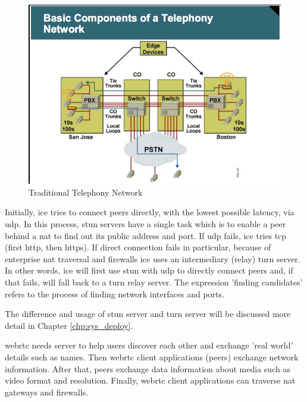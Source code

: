 \begin{figure}
	\centering
    	\includegraphics[height=0.40\textheight,natwidth=610,natheight=642]{figs/telephony_network.png}
  	\caption{Traditional Telephony Network}
  	\label{fig:telephony_network}
\end{figure}

\par Initially, \gls{ice} tries to connect peers directly, with the lowest possible latency, via \gls{udp}. In this process, \gls{stun} servers have a single task which is to enable a peer behind a \gls{nat} to find out its public address and port. If \gls{udp} fails, \gls{ice} tries \gls{tcp} (first \gls{http}, then \gls{https}). If direct connection fails in particular, because of enterprise \gls{nat} traversal and firewalls \gls{ice} uses an intermediary (relay) \gls{turn} server. In other words, \gls{ice} will first use \gls{stun} with \gls{udp} to directly connect peers and, if that fails, will fall back to a \gls{turn} relay server. The expression 'finding candidates' refers to the process of finding network interfaces and ports.\cite{html5rock:webrtc}

\par The difference and usage of \gls{stun} server and \gls{turn} server will be discussed more detail in Chapter \ref{chp:sys_deploy}.

\par \gls{webrtc} needs server to help users discover each other and exchange 'real world' details such as names. Then \gls{webrtc} client applications (peers) exchange network information. After that, peers exchange data information about media such as video format and resolution. Finally, \gls{webrtc} client applications can traverse \gls{nat} gateways and firewalls.

